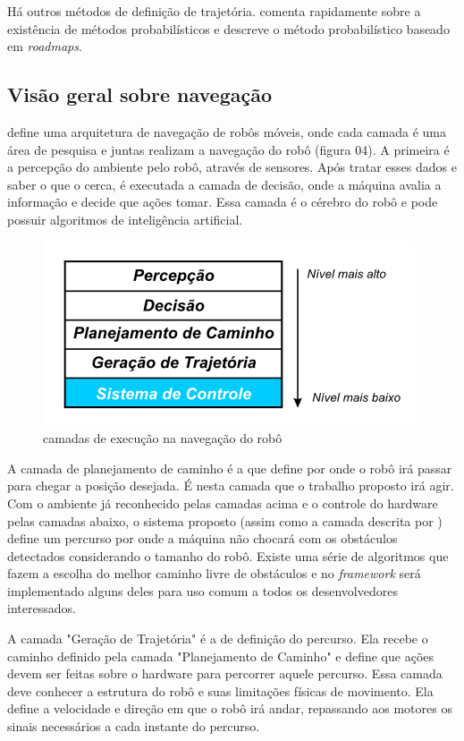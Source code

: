 Há outros métodos de definição de trajetória. \cite{Guzman2008} comenta rapidamente sobre a existência de métodos probabilísticos e \cite{Strandberg2004} descreve o método probabilístico baseado em \textit{roadmaps}.

\subsection{Visão geral sobre navegação}

\cite{Vieira2005} define uma arquitetura de navegação de robôs móveis, onde cada camada é uma área de pesquisa e juntas realizam a navegação do robô (figura 04). A primeira é a percepção do ambiente pelo robô, através de sensores. Após tratar esses dados e saber o que o cerca, é executada a camada de decisão, onde a máquina avalia a informação e decide que ações tomar. Essa camada é o cérebro do robô e pode possuir algoritmos de inteligência artificial.

\begin{figure}[h]
	\centering
	\label{fig04}
		\includegraphics[keepaspectratio=true,scale=1]{figuras/arqRoboMoveis0.png}
	\caption{camadas de execução na navegação do robô \cite{Vieira2005}}
\end{figure}

A camada de planejamento de caminho é a que define por onde o robô irá passar para chegar a posição desejada. É nesta camada que o trabalho proposto irá agir. Com o ambiente já reconhecido pelas camadas acima e o controle do hardware pelas camadas abaixo, o sistema proposto (assim como a camada descrita por \cite{Vieira2005}) define um percurso por onde a máquina não chocará com os obstáculos detectados considerando o tamanho do robô. Existe uma série de algoritmos que fazem a  escolha do melhor caminho livre de obstáculos e no \textit{framework} será implementado alguns deles para uso comum a todos os desenvolvedores interessados.

A camada "Geração de Trajetória" é a de definição do percurso. Ela recebe o caminho definido pela camada "Planejamento de Caminho" e define que ações devem ser feitas sobre o hardware para percorrer aquele percurso. Essa camada deve conhecer a estrutura do robô e suas limitações físicas de movimento. Ela define a velocidade e direção em que o robô irá andar, repassando aos motores os sinais necessários a cada instante do percurso. 

